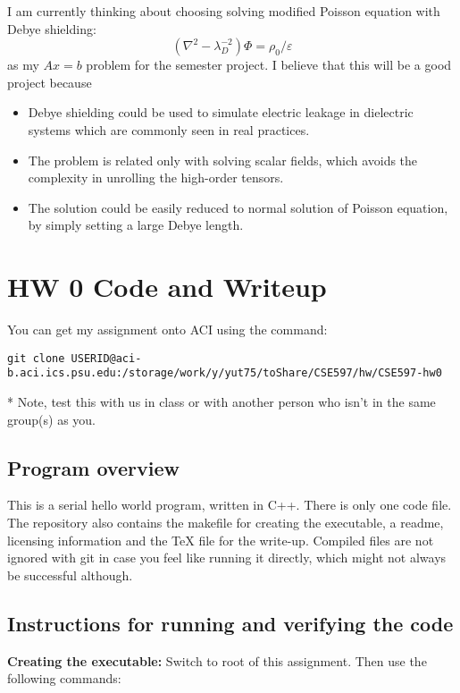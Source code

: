 \documentclass{article}
\begin{document}
\begin{spacing}{1.1}
I am currently thinking about choosing solving modified Poisson equation with Debye shielding:
\[(\nabla^2-\lambda_D^{-2})\Phi=\rho_0/\varepsilon\]
as my $Ax=b$ problem for the semester project. I believe that this will be a good project because
\begin{itemize}
  \item Debye shielding could be used to simulate electric leakage in dielectric systems which are commonly seen in real practices.
  \item The problem is related only with solving scalar fields, which avoids the complexity in unrolling the high-order tensors.
  \item The solution could be easily reduced to normal solution of Poisson equation, by simply setting a large Debye length.
\end{itemize}


\section{HW 0 Code and Writeup}

You can get my assignment onto ACI using the command:

\begin{verbatim}
git clone USERID@aci-b.aci.ics.psu.edu:/storage/work/y/yut75/toShare/CSE597/hw/CSE597-hw0
\end{verbatim}

* Note, test this with us in class or with another person who isn't in the same group(s) as you.

\subsection{Program overview}

This is a serial hello world program, written in C++. There is only one code file. The repository also contains the makefile for creating the executable, a readme, licensing information and the TeX file for the write-up.
Compiled files are not ignored with git in case you feel like running it directly, which might not always be successful although.


\subsection{Instructions for running and verifying the code}

\textbf{Creating the executable:}
Switch to root of this assignment. Then use the following commands:


\end{spacing}
\end{document}
